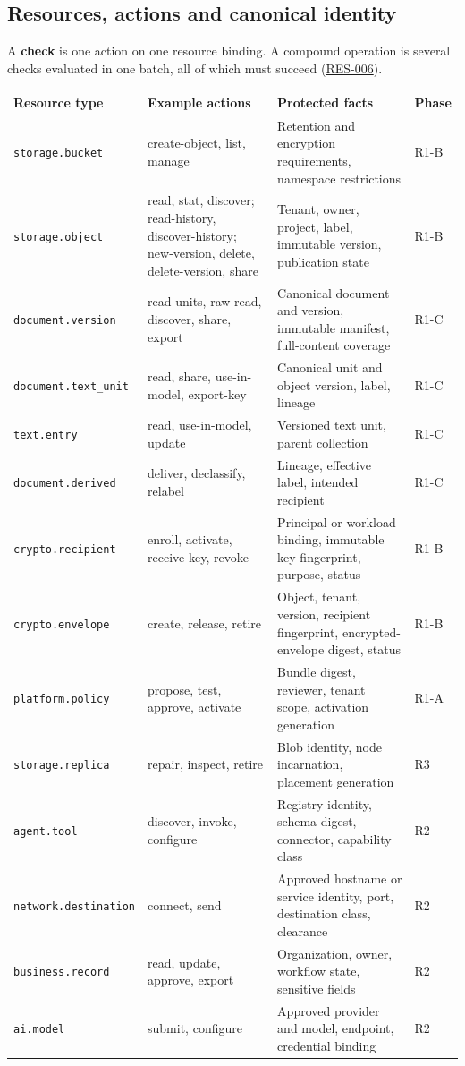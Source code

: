 \documentclass[11pt,a4paper]{article}
\newcommand{\term}[1]{\textbf{#1}}
\newcommand{\code}[1]{{\small\nolinkurl{#1}}}
\newcommand{\rr}[1]{\hyperlink{req:#1}{#1}}
\begin{document}
\subsection{Resources, actions and canonical identity}
A \term{check} is one action on one resource binding. A compound operation is several checks evaluated in one batch, all of which must succeed (\rr{RES-006}).
\begin{longtable}{@{}P{0.25\textwidth}P{0.25\textwidth}P{0.31\textwidth}P{0.08\textwidth}@{}}
\toprule Resource type & Example actions & Protected facts & Phase\\\midrule\endhead
\code{storage.bucket} & create-object, list, manage & Retention and encryption requirements, namespace restrictions & R1-B\\
\code{storage.object} & read, stat, discover; read-history, discover-history; new-version, delete, delete-version, share & Tenant, owner, project, label, immutable version, publication state & R1-B\\
\code{document.version} & read-units, raw-read, discover, share, export & Canonical document and version, immutable manifest, full-content coverage & R1-C\\
\code{document.text_unit} & read, share, use-in-model, export-key & Canonical unit and object version, label, lineage & R1-C\\
\code{text.entry} & read, use-in-model, update & Versioned text unit, parent collection & R1-C\\
\code{document.derived} & deliver, declassify, relabel & Lineage, effective label, intended recipient & R1-C\\
\code{crypto.recipient} & enroll, activate, receive-key, revoke & Principal or workload binding, immutable key fingerprint, purpose, status & R1-B\\
\code{crypto.envelope} & create, release, retire & Object, tenant, version, recipient fingerprint, encrypted-envelope digest, status & R1-B\\
\code{platform.policy} & propose, test, approve, activate & Bundle digest, reviewer, tenant scope, activation generation & R1-A\\
\code{storage.replica} & repair, inspect, retire & Blob identity, node incarnation, placement generation & R3\\
\code{agent.tool} & discover, invoke, configure & Registry identity, schema digest, connector, capability class & R2\\
\code{network.destination} & connect, send & Approved hostname or service identity, port, destination class, clearance & R2\\
\code{business.record} & read, update, approve, export & Organization, owner, workflow state, sensitive fields & R2\\
\code{ai.model} & submit, configure & Approved provider and model, endpoint, credential binding & R2\\
\bottomrule
\end{longtable}
\end{document}
